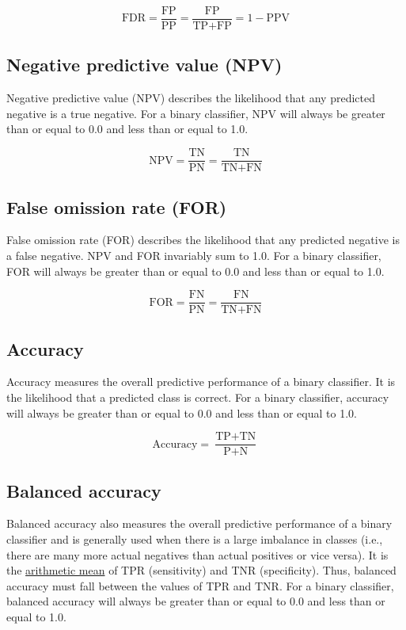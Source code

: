 \documentclass[letterpaper, 12pt]{article}
\begin{document}
$$\textrm{FDR} = \frac{\textrm{FP}}{\textrm{PP}} = \frac{\textrm{FP}}{\textrm{TP} + \textrm{FP}} = 1 - \textrm{PPV}$$

\subsection*{Negative predictive value (NPV)}

Negative predictive value (NPV) describes the likelihood that any predicted negative is a true negative. For a binary classifier, NPV will always be greater than or equal to 0.0 and less than or equal to 1.0.

$$\textrm{NPV} = \frac{\textrm{TN}}{\textrm{PN}} = \frac{\textrm{TN}}{\textrm{TN} + \textrm{FN}}$$

\subsection*{False omission rate (FOR)}

False omission rate (FOR) describes the likelihood that any predicted negative is a false negative. NPV and FOR invariably sum to 1.0. For a binary classifier, FOR will always be greater than or equal to 0.0 and less than or equal to 1.0.

$$\textrm{FOR} = \frac{\textrm{FN}}{\textrm{PN}} = \frac{\textrm{FN}}{\textrm{TN} + \textrm{FN}}$$

\subsection*{Accuracy}

Accuracy measures the overall predictive performance of a binary classifier. It is the likelihood that a predicted class is correct. For a binary classifier, accuracy will always be greater than or equal to 0.0 and less than or equal to 1.0.

$$\textrm{Accuracy} = \frac{\textrm{TP} + \textrm{TN}}{\textrm{P} + \textrm{N}}$$

\subsection*{Balanced accuracy}

Balanced accuracy also measures the overall predictive performance of a binary classifier and is generally used when there is a large imbalance in classes (i.e., there are many more actual negatives than actual positives or vice versa). It is the \href{https://en.wikipedia.org/wiki/Arithmetic_mean}{arithmetic mean} of TPR (sensitivity) and TNR (specificity). Thus, balanced accuracy must fall between the values of TPR and TNR. For a binary classifier, balanced accuracy will always be greater than or equal to 0.0 and less than or equal to 1.0.
\end{document}
